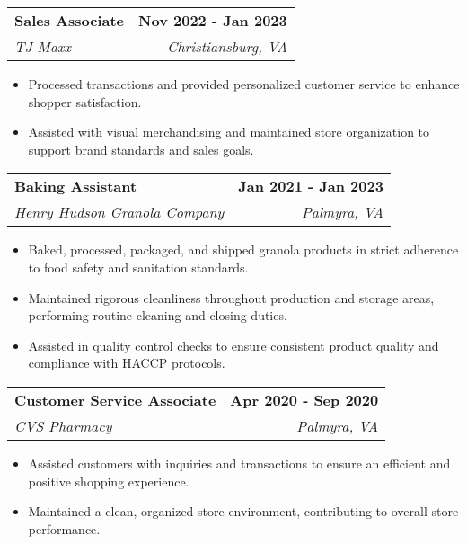 \documentclass[10pt]{article}
\begin{document}
\vspace{5pt}

\noindent
\begin{tabularx}{\textwidth}{X r}
\textbf{Sales Associate} & \textbf{Nov 2022 - Jan 2023}\\
\textit{TJ Maxx} & \textit{Christiansburg, VA}
\end{tabularx}
\begin{itemize}[leftmargin=0.75cm, noitemsep, topsep=0pt]
    \item Processed transactions and provided personalized customer service to enhance shopper satisfaction.
    \item Assisted with visual merchandising and maintained store organization to support brand standards and sales goals.
\end{itemize}

\vspace{5pt}


\noindent
\begin{tabularx}{\textwidth}{X r}
\textbf{Baking Assistant} & \textbf{Jan 2021 - Jan 2023}\\
\textit{Henry Hudson Granola Company} & \textit{Palmyra, VA}
\end{tabularx}
\begin{itemize}[leftmargin=0.75cm, noitemsep, topsep=0pt]
    \item Baked, processed, packaged, and shipped granola products in strict adherence to food safety and sanitation standards.
    \item Maintained rigorous cleanliness throughout production and storage areas, performing routine cleaning and closing duties.
    \item Assisted in quality control checks to ensure consistent product quality and compliance with HACCP protocols.
\end{itemize}

\vspace{5pt}

\noindent
\begin{tabularx}{\textwidth}{X r}
\textbf{Customer Service Associate} & \textbf{Apr 2020 - Sep 2020}\\
\textit{CVS Pharmacy} & \textit{Palmyra, VA}
\end{tabularx}
\begin{itemize}[leftmargin=0.75cm, noitemsep, topsep=0pt]
    \item Assisted customers with inquiries and transactions to ensure an efficient and positive shopping experience.
    \item Maintained a clean, organized store environment, contributing to overall store performance.
\end{itemize}
\end{document}
